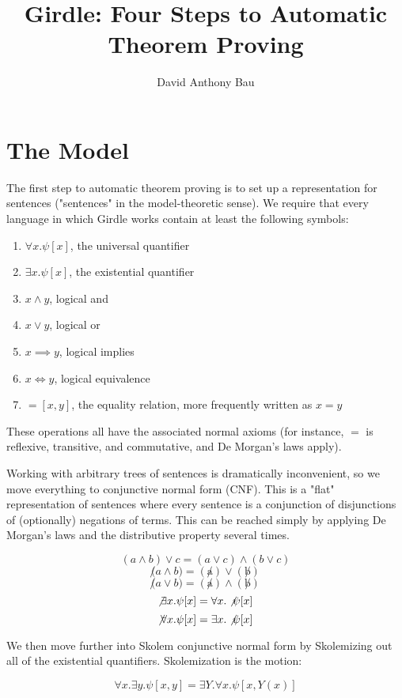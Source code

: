 \documentclass{article}
\title{Girdle: Four Steps to Automatic Theorem Proving}
\author{David Anthony Bau}
\begin{document}
\maketitle

\section{The Model}

The first step to automatic theorem proving is to set up a representation for sentences ("sentences" in the model-theoretic sense). We require that every language in which Girdle works contain at least the following symbols:

\begin{enumerate}
    \item $\forall x. \psi[x]$, the universal quantifier
    \item $\exists x. \psi[x]$, the existential quantifier
    \item $x \land y$, logical and
    \item $x \lor y$, logical or
    \item $x \implies y$, logical implies
    \item $x \iff y$, logical equivalence
    \item $=[x, y]$, the equality relation, more frequently written as $x = y$
\end{enumerate}

These operations all have the associated normal axioms (for instance, $=$ is reflexive, transitive, and commutative, and De Morgan's laws apply).

Working with arbitrary trees of sentences is dramatically inconvenient, so we move everything to conjunctive normal form (CNF). This is a "flat" representation of sentences where every sentence is a conjunction of disjunctions of (optionally) negations of terms. This can be reached simply by applying De Morgan's laws and the distributive property several times.

\[(a \land b) \lor c = (a \lor c) \land (b \lor c)\]
\[\not (a \land b) = (\not a) \lor (\not b)\]
\[\not (a \lor b) = (\not a) \land (\not b)\]
\[\not \exists x. \psi[x] = \forall x. \not \psi[x]\]
\[\not \forall x. \psi[x] = \exists x. \not \psi[x]\]

We then move further into Skolem conjunctive normal form by Skolemizing out all of the existential quantifiers. Skolemization is the motion:

\[\forall x. \exists y. \psi[x, y] = \exists Y. \forall x. \psi[x, Y(x)]\]
\end{document}
